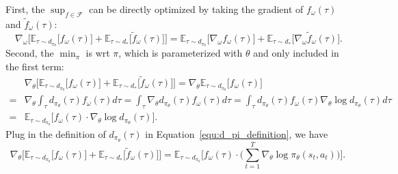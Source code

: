 First, the $\sup_{f\in\mathcal{F}}$ can be directly optimized by taking the gradient of $f_{\omega}(\tau)$ and $\tilde{f}_{\omega}(\tau)$: 
\begin{equation}~\label{equ:gradient_critic}
\nabla_{\omega} \Big[ \mathbb{E}_{\tau\sim d_{\pi_{\theta}}} \big[ f_{\omega}(\tau) \big] + \mathbb{E}_{\tau\sim d_*} \big[ \tilde{f}_{\omega}(\tau) \big] \Big]
= \mathbb{E}_{\tau\sim d_{\pi_{\theta}}} \big[ \nabla_{\omega} f_{\omega}(\tau) \big] + \mathbb{E}_{\tau\sim d_*} \big[ \nabla_{\omega} \tilde{f}_{\omega}(\tau) \big].
\end{equation}
Second, the $\min_{\pi}$ is wrt $\pi$, which is parameterized with $\theta$ and only included in the first term:
\begin{align*}
& \nabla_{\theta} \Big[ \mathbb{E}_{\tau\sim d_{\pi_{\theta}}} \big[ f_{\omega}(\tau) \big] + \mathbb{E}_{\tau\sim d_*} \big[ \tilde{f}_{\omega}(\tau) \big] \Big] 
= \nabla_{\theta} \mathbb{E}_{\tau\sim d_{\pi_{\theta}}} \big[ f_{\omega}(\tau) \big] \\
= & \nabla_{\theta} \int_{\tau} d_{\pi_{\theta}}(\tau) f_{\omega}(\tau) d\tau 
= \int_{\tau} \nabla_{\theta} d_{\pi_{\theta}}(\tau) f_{\omega}(\tau) d\tau 
= \int_{\tau}  d_{\pi_{\theta}}(\tau) f_{\omega}(\tau) \nabla_{\theta}\log d_{\pi_{\theta}}(\tau)  d\tau \\
= & \mathbb{E}_{\tau\sim d_{\pi_\theta}} \big[ f_{\omega}(\tau) \cdot \nabla_{\theta}\log d_{\pi_{\theta}}(\tau) \big].
\end{align*}
Plug in the definition of $d_{\pi_{\theta}}(\tau)$ in Equation~\ref{equ:d_pi_definition}, we have
\begin{equation*}
\nabla_{\theta} \Big[ \mathbb{E}_{\tau\sim d_{\pi_{\theta}}} \big[ f_{\omega}(\tau) \big] + \mathbb{E}_{\tau\sim d_*} \big[ \tilde{f}_{\omega}(\tau) \big] \Big] 
= \mathbb{E}_{\tau\sim d_{\pi_\theta}} \Big[ f_{\omega}(\tau) \cdot \big( \sum_{t=1}^{T}\nabla_{\theta}\log \pi_{\theta}(s_t, a_t) \big) \Big].
\end{equation*}

